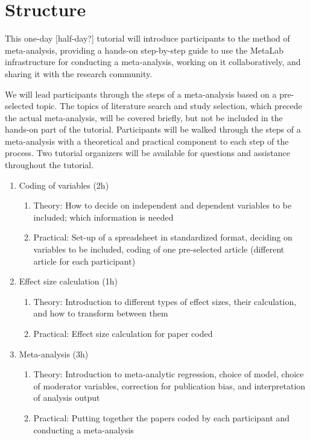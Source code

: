 \documentclass[10pt,letterpaper]{article}
\begin{document}
\section{Structure}

This one-day [half-day?] tutorial will introduce participants to the method of meta-analysis, providing a hands-on step-by-step guide to use the MetaLab infrastructure for conducting a meta-analysis, working on it collaboratively, and sharing it with the research community.

We will lead participants through the steps of a meta-analysis based on a pre-selected topic. The topics of literature search and study selection, which precede the actual meta-analysis, will be covered briefly, but not  be included in the hands-on part of the tutorial. Participants will be walked through the steps of a meta-analysis with a theoretical and practical component to each step of the process. Two tutorial organizers will be available for questions and assistance throughout the tutorial.

\begin{enumerate}
    \item Coding of variables (2h)
    \begin{enumerate}
        \item Theory: How to decide on independent and dependent variables to be included; which information is needed
        \item Practical: Set-up of a spreadsheet in standardized format, deciding on variables to be included, coding of one pre-selected article (different article for each participant)
    \end{enumerate}
    \item Effect size calculation (1h)
    \begin{enumerate}
        \item Theory: Introduction to different types of effect sizes, their calculation, and how to transform between them
        \item Practical: Effect size calculation for paper coded
    \end{enumerate}
    \item Meta-analysis (3h)
    \begin{enumerate}
        \item Theory: Introduction to meta-analytic regression, choice of model, choice of moderator variables, correction for publication bias, and interpretation of analysis output
       \item Practical: Putting together the papers coded by each participant and conducting a meta-analysis
        \end{enumerate}
\end{enumerate}
\end{document}
